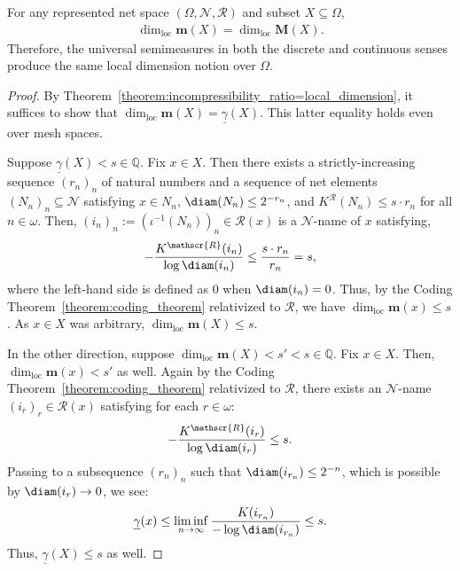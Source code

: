 \begin{corollary}
    For any represented net space $(\Omega, \mathcal{N}, \mathscr{R})$ and subset $X \subseteq \Omega$,
    \begin{align*}
        \dim_{\operatorname{loc}} \mathbf{m}(X) = \dim_{\operatorname{loc}} \mathbf{M}(X).
    \end{align*}
    Therefore, the universal semimeasures in both the discrete and continuous senses produce the same local dimension notion over $\Omega$.
\end{corollary}
\begin{proof}
     By Theorem~\ref{theorem:incompressibility_ratio=local_dimension}, it suffices to show that $\dim_{\operatorname{loc}} \mathbf{m}(X) = \underline{\gamma}(X)$. This latter equality holds even over mesh spaces.

     Suppose $\underline{\gamma}(X) < s \in \mathbb{Q}$. Fix $x \in X$. Then there exists a strictly-increasing sequence $(r_n)_n$ of natural numbers and a sequence of net elements $(N_n)_n \subseteq \mathcal{N}$ satisfying $x \in N_n$, $\diam(N_n) \leq 2^{-r_n}$, and $K^{\mathscr{R}}(N_n) \leq s \cdot r_n$ for all $n \in \omega$. Then, $(i_n)_n := (\iota^{-1}(N_n))_n \in \mathcal{R}(x)$ is a $\mathcal{N}$-name of $x$ satisfying,
     \begin{align*}
         - \frac{K^{\mathscr{R}}(i_n)}{\log \diam(i_n)} \leq \frac{s \cdot r_n}{r_n} = s,
     \end{align*}
     where the left-hand side is defined as $0$ when $\diam(i_n) = 0$. Thus, by the Coding Theorem~\ref{theorem:coding_theorem} relativized to $\mathscr{R}$, we have $\dim_{\operatorname{loc}} \mathbf{m}(x) \leq s$. As $x \in X$ was arbitrary, $\dim_{\operatorname{loc}} \mathbf{m}(X) \leq s$.

    In the other direction, suppose $\dim_{\operatorname{loc}} \mathbf{m}(X) < s' < s \in \mathbb{Q}$. Fix $x \in X$. Then, $\dim_{\operatorname{loc}} \mathbf{m}(x) < s'$ as well. Again by the Coding Theorem~\ref{theorem:coding_theorem} relativized to $\mathscr{R}$, there exists an $\mathcal{N}$-name $(i_r)_r \in \mathcal{R}(x)$ satisfying for each $r \in \omega$: 
    \begin{align*}
        -\frac{K^{\mathscr{R}}(i_r)}{\log \diam(i_r)} \leq s.
    \end{align*}
    Passing to a subsequence $(r_n)_n$ such that $\diam(i_{r_n}) \leq 2^{-n}$, which is possible by $\diam(i_r) \to 0$, we see:
    \begin{align*}
        \underline{\gamma}(x) \leq \liminf_{n \to \infty} \frac{K(i_{r_n})}{- \log \diam(i_{r_n})} \leq s.
    \end{align*}
    Thus, $\underline{\gamma}(X) \leq s$ as well. 
\end{proof}

